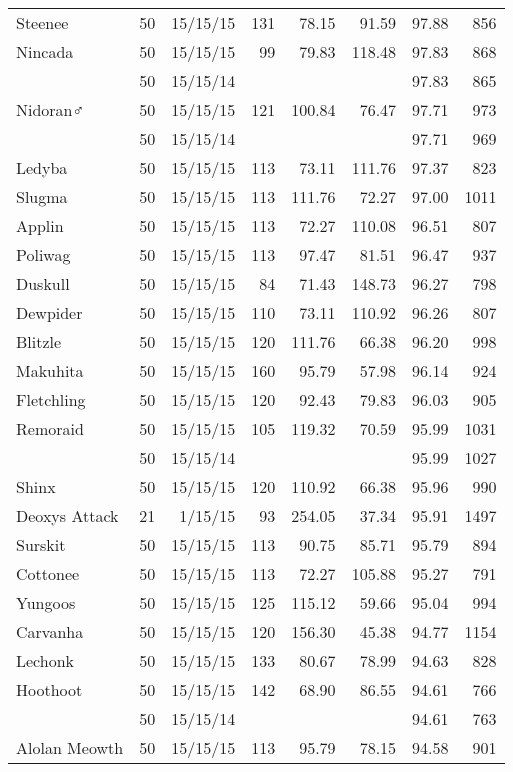 \begin{longtable}{lrrrrrrr}
Steenee & 50 & 15/15/15 & 131 & 78.15 & 91.59 & 97.88 &  856\\
Nincada & 50 & 15/15/15 & 99 & 79.83 & 118.48 & 97.83 &  868\\
 & 50 & 15/15/14 & & & & 97.83 &  865\\
Nidoran♂ & 50 & 15/15/15 & 121 & 100.84 & 76.47 & 97.71 &  973\\
 & 50 & 15/15/14 & & & & 97.71 &  969\\
Ledyba & 50 & 15/15/15 & 113 & 73.11 & 111.76 & 97.37 &  823\\
Slugma & 50 & 15/15/15 & 113 & 111.76 & 72.27 & 97.00 & 1011\\
Applin & 50 & 15/15/15 & 113 & 72.27 & 110.08 & 96.51 &  807\\
Poliwag & 50 & 15/15/15 & 113 & 97.47 & 81.51 & 96.47 &  937\\
Duskull & 50 & 15/15/15 & 84 & 71.43 & 148.73 & 96.27 &  798\\
Dewpider & 50 & 15/15/15 & 110 & 73.11 & 110.92 & 96.26 &  807\\
Blitzle & 50 & 15/15/15 & 120 & 111.76 & 66.38 & 96.20 &  998\\
Makuhita & 50 & 15/15/15 & 160 & 95.79 & 57.98 & 96.14 &  924\\
Fletchling & 50 & 15/15/15 & 120 & 92.43 & 79.83 & 96.03 &  905\\
Remoraid & 50 & 15/15/15 & 105 & 119.32 & 70.59 & 95.99 & 1031\\
 & 50 & 15/15/14 & & & & 95.99 & 1027\\
Shinx & 50 & 15/15/15 & 120 & 110.92 & 66.38 & 95.96 &  990\\
Deoxys Attack & 21 & 1/15/15 & 93 & 254.05 & 37.34 & 95.91 & 1497\\
Surskit & 50 & 15/15/15 & 113 & 90.75 & 85.71 & 95.79 &  894\\
Cottonee & 50 & 15/15/15 & 113 & 72.27 & 105.88 & 95.27 &  791\\
Yungoos & 50 & 15/15/15 & 125 & 115.12 & 59.66 & 95.04 &  994\\
Carvanha & 50 & 15/15/15 & 120 & 156.30 & 45.38 & 94.77 & 1154\\
Lechonk & 50 & 15/15/15 & 133 & 80.67 & 78.99 & 94.63 &  828\\
Hoothoot & 50 & 15/15/15 & 142 & 68.90 & 86.55 & 94.61 &  766\\
 & 50 & 15/15/14 & & & & 94.61 &  763\\
Alolan Meowth & 50 & 15/15/15 & 113 & 95.79 & 78.15 & 94.58 &  901\\

\end{longtable}
